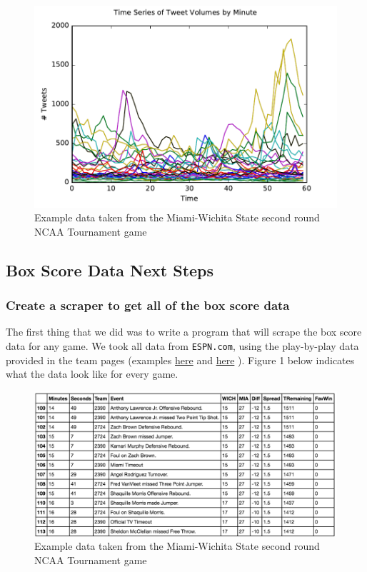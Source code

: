 \documentclass[12pt]{article}
\begin{document}
\begin{figure} [H]
	\centering
	\includegraphics[scale = 0.7]{tweetvolues.pdf} 
	\caption{Example data taken from the Miami-Wichita State second round NCAA Tournament game}
\end{figure}

\subsection*{Box Score Data Next Steps}
\subsubsection*{Create a scraper to get all of the box score data}

The first thing that we did was to write a program that will scrape the box score data for any game. We took all data from \texttt{ESPN.com}, using the play-by-play data provided in the team pages (examples \href{http://espn.go.com/mens-college-basketball/playbyplay?gameId=400871280}{here}
 and \href{http://espn.go.com/mens-college-basketball/playbyplay?gameId=400871252}{here}
). Figure 1 below indicates what the data look like for every game.

\begin{figure} [H]
	\centering
	\includegraphics[scale = 0.7] {boxscore_data.png} 
	\caption{Example data taken from the Miami-Wichita State second round NCAA Tournament game}
\end{figure}
\end{document}
